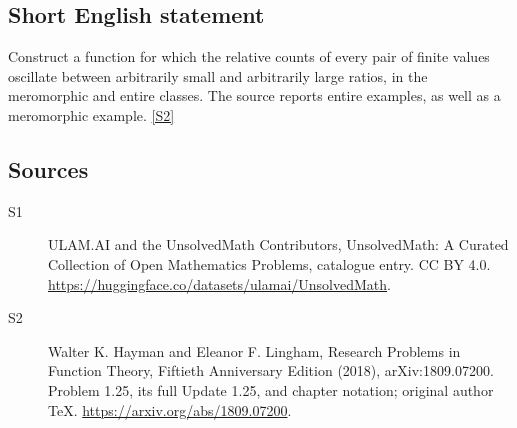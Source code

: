 \documentclass[11pt]{article}
\newcommand{\sref}[2]{\hyperlink{source:#1:#2}{[S#2]}}
\begin{document}
\subsection{Short English statement}
Construct a function for which the relative counts of every pair of finite values oscillate between arbitrarily small and arbitrarily large ratios, in the meromorphic and entire classes. The source reports entire examples, as well as a meromorphic example. \sref{statement}{2}
\subsection{Sources}
\begin{description}
\item[\hypertarget{source:statement:1}{S1}] ULAM.AI and the UnsolvedMath Contributors, UnsolvedMath: A Curated Collection of Open Mathematics Problems, catalogue entry. CC BY 4.0. \url{https://huggingface.co/datasets/ulamai/UnsolvedMath}.
\item[\hypertarget{source:statement:2}{S2}] Walter K. Hayman and Eleanor F. Lingham, Research Problems in Function Theory, Fiftieth Anniversary Edition (2018), arXiv:1809.07200. Problem 1.25, its full Update 1.25, and chapter notation; original author TeX. \url{https://arxiv.org/abs/1809.07200}.
\end{description}
\label{end:statement}
\end{document}
